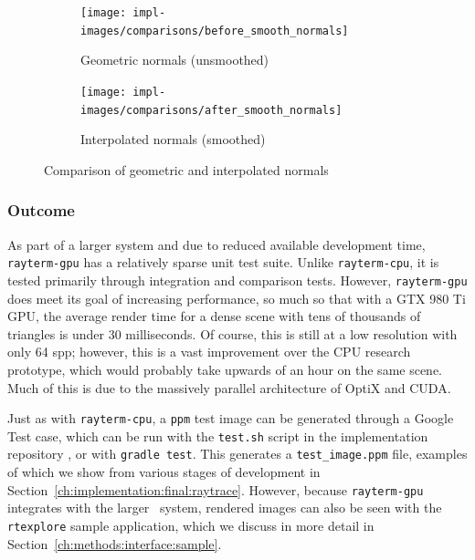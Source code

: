 \vspace{0.3em}
\begin{figure}[htb]
  \centering
  \begin{subfigure}[htb]{0.45\textwidth}
    \texttt{[image: impl-images/comparisons/before\_smooth\_normals]}
    \caption{Geometric normals (unsmoothed)}
\label{fig:rayterm-gpu_unsmoothed_normals}
  \end{subfigure}
  \hspace{1em}
  \begin{subfigure}[htb]{0.45\textwidth}
    \texttt{[image: impl-images/comparisons/after\_smooth\_normals]}
    \caption{Interpolated normals (smoothed)}
\label{fig:rayterm-gpu_smoothed_normals}
  \end{subfigure}
  \caption{Comparison of geometric and interpolated normals}
\label{fig:rayterm-gpu_smooth_normal_comparison}
\end{figure}

\subsubsection{Outcome} \label{ch:methods:renderer:parallel:outcome}

As part of a larger system and due to reduced available development time, \texttt{rayterm-gpu} has a relatively sparse unit test suite.
Unlike \texttt{rayterm-cpu}, it is tested primarily through integration and comparison tests.
However, \texttt{rayterm-gpu} does meet its goal of increasing performance, so much so that with a GTX 980 Ti GPU, the average render time for a dense scene with tens of thousands of triangles is under 30 milliseconds.
Of course, this is still at a low resolution with only 64 spp; however, this is a vast improvement over the CPU research prototype, which would probably take upwards of an hour on the same scene.
Much of this is due to the massively parallel architecture of OptiX and CUDA.

Just as with \texttt{rayterm-cpu}, a \texttt{ppm} test image can be generated through a Google Test \cite{googletest} case, which can be run with the \texttt{test.sh} script in the implementation repository \cite{raytermCpuImpl}, or with \texttt{gradle test}.
This generates a \texttt{test\_image.ppm} file, examples of which we show from various stages of development in Section~\ref{ch:implementation:final:raytrace}.
However, because \texttt{rayterm-gpu} integrates with the larger \name\ system, rendered images can also be seen with the \texttt{rtexplore} sample application, which we discuss in more detail in Section~\ref{ch:methods:interface:sample}.

